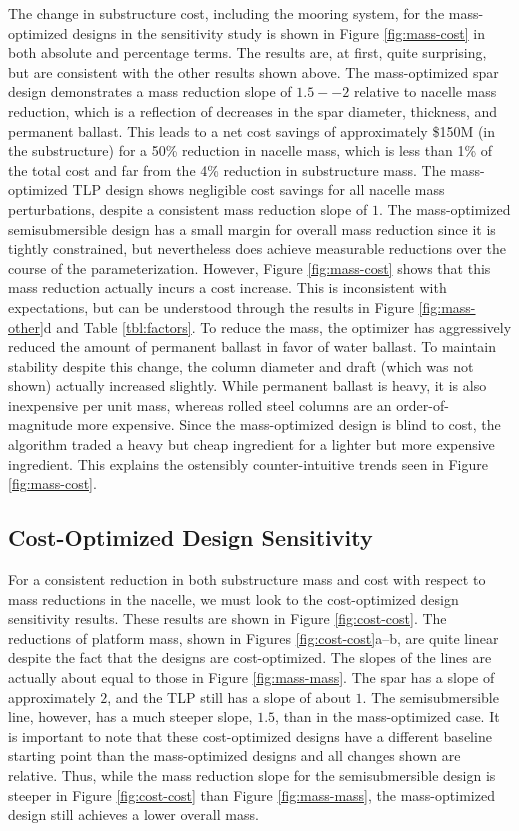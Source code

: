 The change in substructure cost, including the mooring system, for the
mass-optimized designs in the sensitivity study is shown in Figure
\ref{fig:mass-cost} in both absolute and percentage terms.  The results
are, at first, quite surprising, but are consistent with the other
results shown above.  The mass-optimized spar design demonstrates a mass
reduction slope of $1.5--2$ relative to nacelle mass reduction, which is
a reflection of decreases in the spar diameter, thickness, and permanent
ballast.  This leads to a net cost savings of approximately \$150M (in
the substructure) for a 50\% reduction in nacelle mass, which is less
than 1\% of the total cost and far from the 4\% reduction in
substructure mass.  The mass-optimized TLP design shows negligible cost
savings for all nacelle mass perturbations, despite a consistent mass
reduction slope of $1$.  The mass-optimized semisubmersible design has a
small margin for overall mass reduction since it is tightly constrained,
but nevertheless does achieve measurable reductions over the course of
the parameterization.  However, Figure \ref{fig:mass-cost} shows that
this mass reduction actually incurs a cost increase.  This is
inconsistent with expectations, but can be understood through the
results in Figure \ref{fig:mass-other}d and Table \ref{tbl:factors}.  To
reduce the mass, the optimizer has aggressively reduced the amount of
permanent ballast in favor of water ballast.  To maintain stability
despite this change, the column diameter and draft (which was not shown)
actually increased slightly.  While permanent ballast is heavy, it is
also inexpensive per unit mass, whereas rolled steel columns are an
order-of-magnitude more expensive.  Since the mass-optimized design is
blind to cost, the algorithm traded a heavy but cheap ingredient for a
lighter but more expensive ingredient.  This explains the ostensibly
counter-intuitive trends seen in Figure \ref{fig:mass-cost}.

\subsection{Cost-Optimized Design Sensitivity}
For a consistent reduction in both substructure mass and cost with
respect to mass reductions in the nacelle, we must look to the
cost-optimized design sensitivity results.  These results are shown in
Figure \ref{fig:cost-cost}.  The reductions of platform mass, shown in
Figures \ref{fig:cost-cost}a--b, are quite linear despite the fact that
the designs are cost-optimized.  The slopes of the lines are actually
about equal to those in Figure \ref{fig:mass-mass}.  The spar has a
slope of approximately $2$, and the TLP still has a slope of about $1$.
The semisubmersible line, however, has a much steeper slope, $1.5$, than
in the mass-optimized case.  It is important to note that these
cost-optimized designs have a different baseline starting point than the
mass-optimized designs and all changes shown are relative.  Thus, while
the mass reduction slope for the semisubmersible design is steeper in
Figure \ref{fig:cost-cost} than Figure \ref{fig:mass-mass}, the
mass-optimized design still achieves a lower overall mass.

